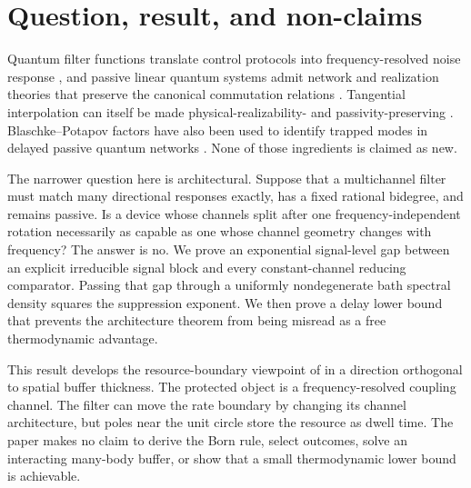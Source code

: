 \documentclass[11pt]{article}
\theoremstyle{definition}
\theoremstyle{remark}
\begin{document}
\section{Question, result, and non-claims}

Quantum filter functions translate control protocols into frequency-resolved
noise response \cite{PazSilvaViola2014,CerfontaineEtAl2021}, and passive linear
quantum systems admit network and realization theories that preserve the
canonical commutation relations \cite{GoughJames2009,GoughGohmYanagisawa2009,GoughZhang2015}.
Tangential interpolation can itself be made physical-realizability- and
passivity-preserving \cite{TechakesariNurdin2017}.  Blaschke--Potapov factors
have also been used to identify trapped modes in delayed passive quantum
networks \cite{TabakMabuchi2016}.  None of those ingredients is claimed as new.

The narrower question here is architectural.  Suppose that a multichannel
filter must match many directional responses exactly, has a fixed rational
bidegree, and remains passive.  Is a device whose channels split after one
frequency-independent rotation necessarily as capable as one whose channel
geometry changes with frequency?  The answer is no.  We prove an exponential
signal-level gap between an explicit irreducible signal block and every
constant-channel reducing comparator.  Passing that gap through a uniformly
nondegenerate bath spectral density squares the suppression exponent.  We
then prove a delay lower bound that prevents the architecture theorem from
being misread as a free thermodynamic advantage.

This result develops the resource-boundary viewpoint of
\cite{ErikssonCut2026} in a direction orthogonal to spatial buffer thickness.
The protected object is a frequency-resolved coupling channel.  The filter can
move the rate boundary by changing its channel architecture, but poles near
the unit circle store the resource as dwell time.  The paper makes no claim to
derive the Born rule, select outcomes, solve an interacting many-body buffer,
or show that a small thermodynamic lower bound is achievable.
\end{document}
